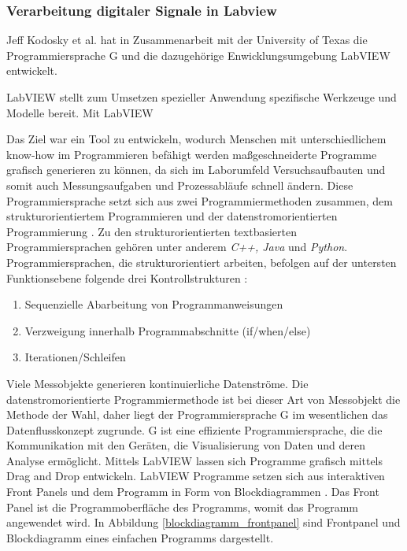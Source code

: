 \documentclass[
fontsize=12pt, 
paper=a4, 
BCOR=10mm, 
twoside=false,
 DIV=10, 
 headsepline, 
 footsepline
 ]{scrartcl}
\begin{document}
\subsubsection{Verarbeitung digitaler Signale in Labview}

Jeff Kodosky et al. hat in Zusammenarbeit mit der University of Texas die Programmiersprache G und die dazugehörige Enwicklungsumgebung LabVIEW entwickelt. 

LabVIEW stellt zum Umsetzen spezieller Anwendung spezifische Werkzeuge und Modelle bereit. Mit LabVIEW 

Das Ziel war ein Tool zu entwickeln, wodurch Menschen mit unterschiedlichem know-how im Programmieren befähigt werden maßgeschneiderte Programme grafisch generieren zu können, da sich im Laborumfeld Versuchsaufbauten und somit auch Messungsaufgaben und Prozessabläufe schnell ändern. Diese Programmiersprache setzt sich aus zwei Programmiermethoden zusammen, dem strukturorientiertem Programmieren und der datenstromorientierten Programmierung  \cite{kodosky}. Zu den strukturorientierten textbasierten Programmiersprachen gehören unter anderem \textit{C++, Java} und \textit{Python}. Programmiersprachen, die strukturorientiert arbeiten, befolgen auf der untersten Funktionsebene folgende drei Kontrollstrukturen \cite{structured}:

\begin{enumerate}
\item Sequenzielle Abarbeitung von Programmanweisungen
\item Verzweigung innerhalb Programmabschnitte (if/when/else)
\item Iterationen/Schleifen
\end{enumerate} 

Viele Messobjekte generieren kontinuierliche Datenströme. Die datenstromorientierte Programmiermethode ist bei dieser Art von Messobjekt die Methode der Wahl, daher liegt der Programmiersprache G im wesentlichen das Datenflusskonzept zugrunde. G ist eine effiziente Programmiersprache, die die Kommunikation mit den Geräten, die Visualisierung von Daten und deren Analyse ermöglicht. Mittels LabVIEW lassen sich Programme grafisch mittels Drag and Drop entwickeln. LabVIEW Programme setzen sich aus interaktiven Front Panels und dem Programm in Form von Blockdiagrammen \cite{kodosky}. Das Front Panel ist die Programmoberfläche des Programms, womit das Programm angewendet wird. In Abbildung \ref{blockdiagramm_frontpanel} sind Frontpanel und Blockdiagramm eines einfachen Programms dargestellt.
\end{document}
